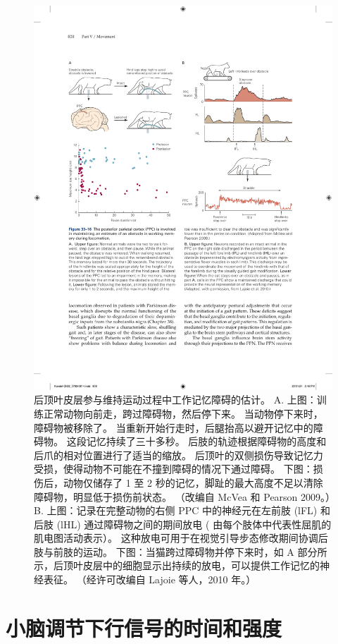\begin{figure}[htbp]
	\centering
	\includegraphics[width=0.95\linewidth]{chap33/fig_33_16}
	\caption{后顶叶皮层参与维持运动过程中工作记忆障碍的估计。 A. 上图：训练正常动物向前走，跨过障碍物，然后停下来。 当动物停下来时，障碍物被移除了。 当重新开始行走时，后腿抬高以避开记忆中的障碍物。 这段记忆持续了三十多秒。 后肢的轨迹根据障碍物的高度和后爪的相对位置进行了适当的缩放。 后顶叶的双侧损伤导致记忆力受损，使得动物不可能在不撞到障碍的情况下通过障碍。 下图：损伤后，动物仅储存了 1 至 2 秒的记忆，脚趾的最大高度不足以清除障碍物，明显低于损伤前状态。 （改编自 McVea 和 Pearson 2009。）B. 上图：记录在完整动物的右侧 PPC 中的神经元在左前肢 (lFL) 和后肢 (lHL) 通过障碍物之间的期间放电 ( 由每个肢体中代表性屈肌的肌电图活动表示）。 这种放电可用于在视觉引导步态修改期间协调后肢与前肢的运动。 下图：当猫跨过障碍物并停下来时，如 A 部分所示，后顶叶皮层中的细胞显示出持续的放电，可以提供工作记忆的神经表征。 （经许可改编自 Lajoie 等人，2010 年。）}
	\label{fig:33_16}
\end{figure}



\section{小脑调节下行信号的时间和强度}

